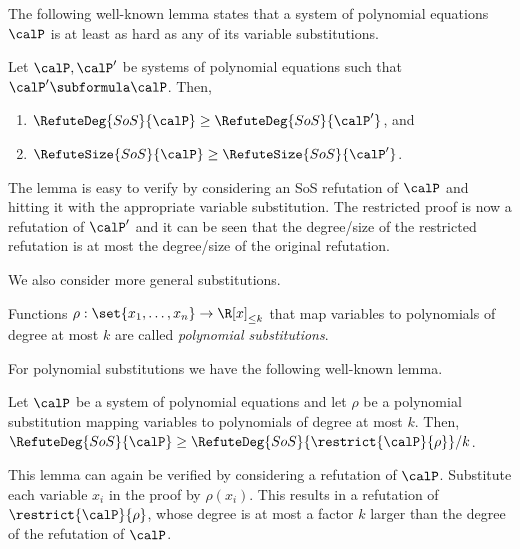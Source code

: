 The following well-known lemma states that a system of polynomial
equations $\calP$ is at least as hard as any of its variable substitutions.
\begin{lemma}\label{lem:subformula}
  Let $\calP, \calP'$ be systems of polynomial equations such that
  $\calP' \subformula \calP$. Then,
  \begin{enumerate}[label=$(\roman*)$]
  \item $\RefuteDeg{SoS}{\calP} \ge \RefuteDeg{SoS}{\calP'}$, and
  \item $\RefuteSize{SoS}{\calP} \ge \RefuteSize{SoS}{\calP'}$.
  \end{enumerate}
\end{lemma}
The lemma is easy to verify by considering an SoS refutation of
$\calP$ and hitting it with the appropriate variable substitution. The
restricted proof is now a refutation of $\calP'$ and it can be seen
that the degree/size of the restricted refutation is at most the
degree/size of the original refutation.

We also consider more general substitutions.

\begin{definition}
  Functions
  $\rho: \set{x_1, \ldots, x_n} \rightarrow \R[x]_{\le k}$ that map
  variables to polynomials of degree at most $k$ are called
  \emph{polynomial substitutions}.
\end{definition}

For polynomial substitutions we have the following well-known lemma.

\begin{lemma}
  \label{lem:sos degree polynomial substitution}
  Let $\calP$ be a system of polynomial equations and let $\rho$ be a
  polynomial substitution mapping variables to polynomials of degree
  at most $k$. Then,
  $\RefuteDeg{SoS}{\calP} \ge
  \RefuteDeg{SoS}{\restrict{\calP}{\rho}}/k$.
\end{lemma}

This lemma can again be verified by considering a refutation of
$\calP$. Substitute each variable $x_i$ in the proof by
$\rho(x_i)$. This results in a refutation of $\restrict{\calP}{\rho}$,
whose degree is at most a factor $k$ larger than the degree of the
refutation of $\calP$.

